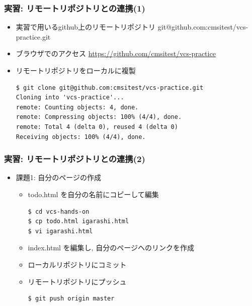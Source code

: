 \begin{frame}[t,fragile]
  \frametitle{実習: リモートリポジトリとの連携(1)}
  \begin{itemize}
  \item 実習で用いるgithub上のリモートリポジトリ git@github.com:cmsitest/vcs-practice.git
  \item ブラウザでのアクセス \url{https://github.com/cmsitest/vcs-practice}
  \item リモートリポジトリをローカルに複製
\begin{lstlisting}
$ git clone git@github.com:cmsitest/vcs-practice.git
Cloning into 'vcs-practice'...
remote: Counting objects: 4, done.
remote: Compressing objects: 100% (4/4), done.
remote: Total 4 (delta 0), reused 4 (delta 0)
Receiving objects: 100% (4/4), done.
\end{lstlisting}
  \end{itemize}
\end{frame}

\begin{frame}[t,fragile]
  \frametitle{実習: リモートリポジトリとの連携(2)}
  \begin{itemize}
  \item 課題1: 自分のページの作成
    \begin{itemize}
      \item todo.html を自分の名前にコピーして編集
\begin{lstlisting}
$ cd vcs-hands-on
$ cp todo.html igarashi.html
$ vi igarashi.html
\end{lstlisting}
      \item index.html を編集し, 自分のページヘのリンクを作成
      \item ローカルリポジトリにコミット
      \item リモートリポジトリにプッシュ
\begin{lstlisting}
$ git push origin master
\end{lstlisting}
    \end{itemize}
  \end{itemize}
\end{frame}

